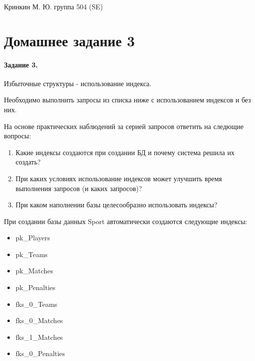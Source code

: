 \documentclass[a4paper,12pt]{article}
\begin{document}
\sloppy

\lstset{
	basicstyle=\small,
	stringstyle=\ttfamily,
	showstringspaces=false,
	columns=fixed,
	breaklines=true,
	numbers=right,
	numberstyle=\tiny
}

\newtheorem{Def}{Определение}[section]
\newtheorem{Th}{Теорема}
\newtheorem{Lem}[Th]{Лемма}
\newenvironment{Proof}
	{\par\noindent{\bf Доказательство.}}
	{\hfill$\scriptstyle\blacksquare$}
\newenvironment{Solution}
	{\par\noindent{\bf Решение.}}
	{\hfill$\scriptstyle\blacksquare$}


\begin{flushright}
	Кринкин М. Ю. группа 504 (SE)
\end{flushright}

\section{Домашнее задание 3}

\paragraph{Задание 3.} Избыточные структуры - использование индекса.

Необходимо выполнить запросы из списка ниже с использованием индексов и без них.

На основе практических наблюдений за серией запросов ответить на следющие вопросы:
\begin{enumerate}
\item Какие индексы создаются при создании БД и почему система решила их создать?

\item При каких условиях использование индексов может улучшить время выполнения запросов (и каких запросов)?

\item При каком наполнении базы целесообразно использовать индексы?
\end{enumerate}

При создании базы данных Sport автоматически создаются следующие индексы:
\begin{itemize}
\item pk\_Players

\item pk\_Teams

\item pk\_Matches

\item pk\_Penalties

\item fks\_0\_Teams

\item fks\_0\_Matches

\item fks\_1\_Matches

\item fks\_0\_Penalties
\end{itemize}
\end{document}
